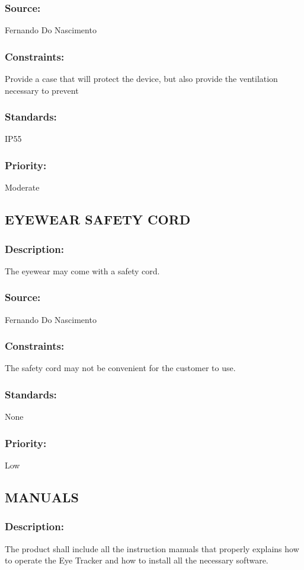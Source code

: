 \subsubsection{Source:} 
	{Fernando Do Nascimento}
\subsubsection{Constraints:} 
{Provide a case that will protect the device, but also provide the ventilation necessary to prevent}
\subsubsection{Standards:}
	{ IP55}
\subsubsection{Priority:}{ Moderate}

\subsection{\text EYEWEAR SAFETY CORD}
\subsubsection{Description:} 
{The eyewear may come with a safety cord.}
\subsubsection{Source:} 
{Fernando Do Nascimento}
\subsubsection{Constraints: }
{The safety cord may not be convenient for the customer to use.}
\subsubsection{Standards:} 
{None}
\subsubsection{Priority: }
{Low}

\subsection{\text MANUALS}
\subsubsection{Description: }
	{The product shall include all the instruction manuals that properly explains how to operate the Eye Tracker and how to install all the necessary software.}
